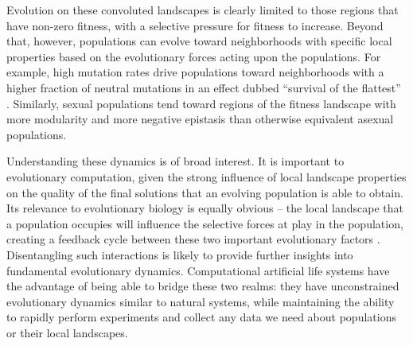 \documentclass[PhD]{msu-thesis}
\begin{document}
Evolution on these convoluted landscapes is clearly limited to those regions that have non-zero fitness, with a selective pressure for fitness to increase. Beyond that, however, populations can evolve toward neighborhoods with specific local properties based on the evolutionary forces acting upon the populations.  For example, high mutation rates drive populations toward neighborhoods with a higher fraction of neutral mutations in an effect dubbed “survival of the flattest” \cite{wilke_evolution_2001}. Similarly, sexual populations tend toward regions of the fitness landscape with more modularity \cite{misevic_sexual_2006} and more negative epistasis \cite{misevic_experiments_2010} than otherwise equivalent asexual populations.

Understanding these dynamics is of broad interest.  It is important to evolutionary computation, given the strong influence of local landscape properties on the quality of the final solutions that an evolving population is able to obtain. Its relevance to evolutionary biology is equally obvious -- the local landscape that a population occupies will influence the selective forces at play in the population, creating a feedback cycle between these two important evolutionary factors \cite{zaman_coevolution_2014,meyer_repeatability_2012}. Disentangling such interactions is likely to provide further insights into fundamental evolutionary dynamics.  Computational artificial life systems have the advantage of being able to bridge these two realms: they have unconstrained evolutionary dynamics similar to natural systems, while maintaining the ability to rapidly perform experiments and collect any data we need about populations or their local landscapes.
%
%
%
%
%
%
\end{document}
